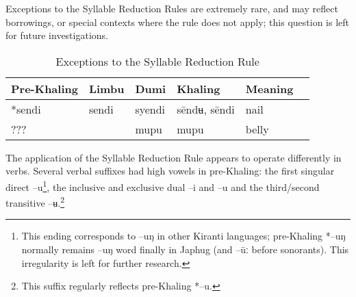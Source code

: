 \documentclass[oldfontcommands,oneside,a4paper,11pt]{article}
\newcommand{\ipa}[1]{{\phon \mbox{#1}}} %
\begin{document}
Exceptions to the Syllable Reduction Rules are extremely rare, and may reflect borrowings, or special contexts where the rule does not apply; this question is left for future investigations.

\begin{table}[H]
\caption{Exceptions to the Syllable Reduction Rule} \centering \label{tab:non.reduction}
\begin{tabular}{llllll}
\toprule
Pre-Khaling	&Limbu	&Dumi	&Khaling	&Meaning\\
\midrule
\ipa{*sendi}			&\ipa{sendi}&	\ipa{syendi}	&	\ipa{sēndʉ}, \ipa{sēndi}	&	nail \\
 	???& &	\ipa{mupu}	&	  \ipa{mupu}	&	belly \\
\bottomrule
\end{tabular}
\end{table}

The application of the Syllable Reduction Rule appears to operate differently in verbs. Several verbal suffixes had high vowels in pre-Khaling: the first singular direct \ipa{--u}\footnote{This ending corresponds to \ipa{--uŋ} in other Kiranti languages; pre-Khaling \ipa{*--uŋ} normally remains \ipa{--uŋ} word finally in Japhug (and \ipa{--ūː} before sonorants). This irregularity is left for further research.}, the inclusive and exclusive dual --\ipa{i} and --\ipa{u} and the third/second transitive \ipa{--ʉ}.\footnote{This suffix regularly reflects pre-Khaling \ipa{*--u}.}
\end{document}
